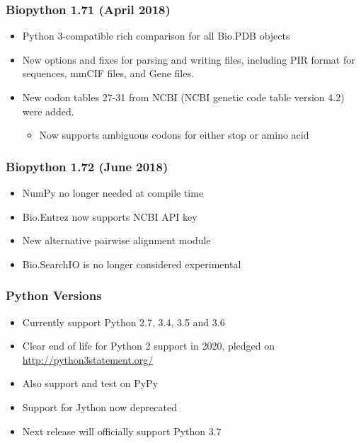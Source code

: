 \begin{frame}
\frametitle{Biopython 1.71 (April 2018)}
\begin{itemize}
   \item Python 3-compatible rich comparison for all Bio.PDB objects
   \item New options and fixes for parsing and writing files, including PIR format for sequences, mmCIF files, and Gene files.
   \item New codon tables 27-31 from NCBI (NCBI genetic code table version 4.2) were added.
       \begin{itemize}
          \item Now supports ambiguous codons for either stop or amino acid
       \end{itemize}
\end{itemize}
\end{frame}

\begin{frame}
\frametitle{Biopython 1.72 (June 2018)}
\begin{itemize}
    \item NumPy no longer needed at compile time
    \item Bio.Entrez now supports NCBI API key
    \item New alternative pairwise alignment module
    \item Bio.SearchIO is no longer considered experimental
\end{itemize}
\end{frame}

\begin{frame}
\frametitle{Python Versions}
\begin{itemize}
\item Currently support Python 2.7, 3.4, 3.5 and 3.6
\item Clear end of life for Python 2 support in 2020, pledged on \url{http://python3statement.org/}
\item Also support and test on PyPy
\item Support for Jython now deprecated
\item Next release will officially support Python 3.7
\end{itemize}
\end{frame}


